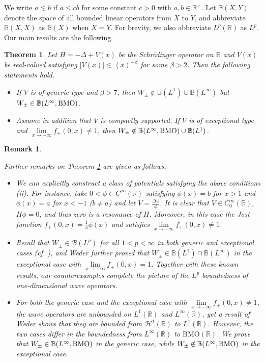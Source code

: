 \documentclass[reqno]{amsart}
\newtheorem{theorem}[definition]{Theorem}
\newtheorem{remark}[definition]{Remark}
\newcommand\R{\mathbb{R}}
\newcommand\B{\mathbb{B}}
\numberwithin{equation}{section}
\begin{document}
We write $a\lesssim b$ if $a\leq cb$ for some constant $c>0$ with $a,b\in\R^{+}$. Let $\B(X,Y)$ denote the space of all bounded linear operators from $X$ to $Y$, and abbreviate $\B(X,X)$ as $\B(X)$ when $X=Y$. For brevity, we also abbreviate $L^{p}(\R)$ as $L^p$. Our main results are the following.
\begin{theorem}\label{thm of Main reult}
Let $H=-\Delta+V(x)$ be the Schr\"odinger operator on $\R$ and $V(x)$ be real-valued satisfying $|V(x)|\lesssim\left<x\right>^{-\beta}$ for some $\beta>2$. Then the following statements hold.
\begin{itemize}
\item[{\rm(i)}] If  $V$ is of generic type and $\beta>7$, then $W_{\pm}\notin\B(L^1)\cup\B(L^{\infty})$ but $W_{\pm}\in\B(L^{\infty},{\rm BMO})$. 
 \item[{\rm(ii)}] Assume in addition that $V$ is compactly supported. If $V$ is of exceptional type and $\lim\limits_{x\rightarrow-\infty}f_+(0,x)\neq1$, then $W_{\pm}\notin\B(L^{\infty},{\rm BMO})\cup\B(L^1)$.
\end{itemize}
 \end{theorem}
\begin{remark}\label{rema of main theo}
{\rm Further remarks 
 on Theorem \ref{thm of Main reult} are given as follows.
\begin{itemize}
\item We can explicitly construct a class of potentials satisfying the above conditions (ii). For instance, take $0<\phi\in C^{\infty}(\R)$ satisfying $\phi(x)=b$ for $x>1$ and $\phi(x)=a$ for $x<-1$ ($b\neq a$) and let $V=\frac{\Delta\phi}{\phi}$. It is clear that $ V\in C^{\infty}_0(\R)$, $H\phi=0$, and thus zero is a resonance of $H$. Moreover, in this case the Jost function $f_+(0,x)=\frac{1}{b}\phi(x)$ and satisfies $\lim\limits_{x\rightarrow-\infty}f_+(0,x)\neq1$.
\vskip0.1cm
\item Recall that $W_{\pm}\in\mathcal{B}(L^{p})$ for all $1<p<\infty$ in both generic and exceptional cases (cf. \cite{DF06,GY00,Wed99}), and Weder further proved that $W_{\pm}\in\B(L^1)\cap\B(L^{\infty})$ in the exceptional case with
$\lim\limits_{x\to-\infty}f_{+}(0,x)=1$. Together with these known results, our
counterexamples complete the picture of the $L^{p}$ boundedness of
one-dimensional wave operators. 
\item For both the generic case and the exceptional case with
$\lim\limits_{x\to-\infty}f_{+}(0,x)\neq1$, the wave operators are unbounded on
$L^{1}(\R)$ and $L^{\infty}(\R)$, yet a result of Weder shows that they are bounded
from $\mathcal{H}^{1}(\R)$ to $L^{1}(\R)$. However, the two cases differ in the boundedness from 
$L^{\infty}(\R)$ to $\mathrm{BMO}(\R)$. We prove that $W_{\pm}\in\B(L^{\infty},{\rm BMO})$ in the generic case, while $W_{\pm}\notin\B(L^{\infty},{\rm BMO})$ in the
exceptional case.
\end{itemize}
}
\end{remark}
\end{document}
